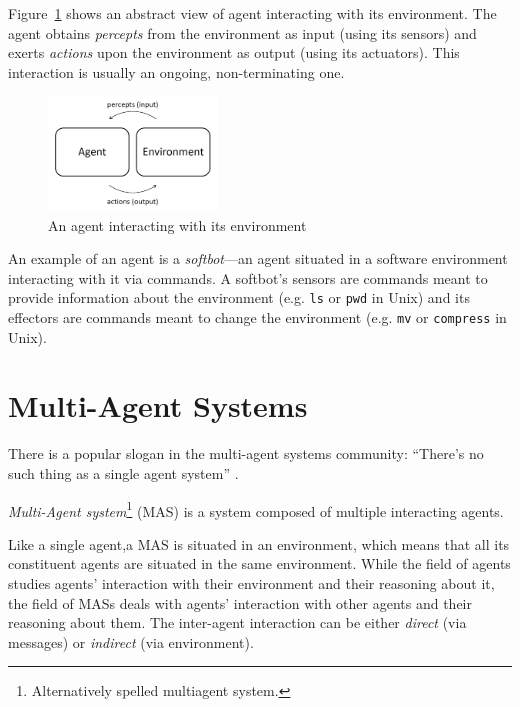 Figure~\ref{figure:agent-environment-interaction} shows an abstract view of agent interacting with its environment.
The agent obtains \textit{percepts} from the environment as input (using its sensors) and exerts \textit{actions} upon the environment as output (using its actuators).
This interaction is usually an ongoing, non-terminating one.

\begin{figure}[h]
	\centering
	\includegraphics[width=0.4\textwidth]{images/agent-environment-interaction.png}
	\caption{An agent interacting with its environment}
	\label{figure:agent-environment-interaction}
\end{figure}

An example of an agent is a \textit{softbot}---an agent situated in a software environment interacting with it via commands. A softbot's sensors are commands meant to provide information about the environment (e.g. \texttt{ls} or \texttt{pwd} in Unix) and its effectors are commands meant to change the environment (e.g. \texttt{mv} or \texttt{compress} in Unix).

\section{Multi-Agent Systems}

There is a popular slogan in the multi-agent systems community: ``There's no such thing as a single agent system'' \cite{Wooldridge09}.

\textit{Multi-Agent system}\footnote{Alternatively spelled multiagent system.} (MAS) is a system composed of multiple interacting agents.

Like a single agent,a MAS is situated in an environment, which means that all its constituent agents are situated in the same environment.
While the field of agents studies agents' interaction with their environment and their reasoning about it, the field of MASs deals with agents' interaction with other agents and their reasoning about them.
The inter-agent interaction can be either \textit{direct} (via messages) or \textit{indirect} (via environment).

